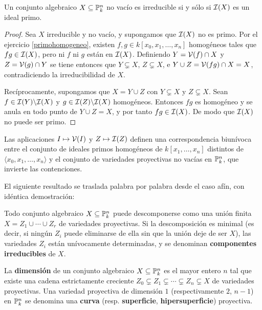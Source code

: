 \documentclass[ACGA.tex]{subfiles}
\begin{document}
 \begin{prop}
  Un conjunto algebraico $X\subseteq\mathbb{P}^n_k$ no vacío es irreducible si y sólo si $\mathcal{I}(X)$ es un ideal primo.
 \end{prop}

\begin{proof}
 Sea $X$ irreducible y no vacío, y supongamos que $\mathcal{I}(X)$ no es primo. Por el ejercicio \ref{primohomogeneo}, existen $f,g\in k[x_0,x_1,\ldots,x_n]$ homogéneos tales que $fg\in\mathcal{I}(X)$, pero ni $f$ ni $g$ están en $\mathcal{I}(X)$. Definiendo $Y=\mathcal{V}(f)\cap X$ y $Z=\mathcal{V}(g)\cap Y$ se tiene entonces que $Y\subsetneq X$, $Z\subsetneq X$, e $Y\cup Z =\mathcal{V}(fg)\cap X=X$, contradiciendo la irreducibilidad de $X$.

Recíprocamente, supongamos que $X=Y\cup Z$ con $Y\subsetneq X$ y $Z\subsetneq X$. Sean $f\in \mathcal{I}(Y)\backslash \mathcal{I}(X)$ y $g\in \mathcal{I}(Z)\backslash\mathcal{I}(X)$ homogéneos. Entonces $fg$ es homogéneo y se anula en todo punto de $Y\cup Z=X$, y por tanto $fg\in\mathcal{I}(X)$. De modo que $\mathcal{I}(X)$ no puede ser primo.
\end{proof}

\begin{coro}
 Las aplicaciones $I\mapsto\mathcal{V}(I)$ y $Z\mapsto\mathcal{I}(Z)$ definen una correspondencia biunívoca entre el conjunto de ideales primos homogéneos de $k[x_1,\ldots,x_n]$ distintos de $\langle x_0,x_1,\ldots,x_n\rangle$ y el conjunto de variedades proyectivas no vacías en $\mathbb{P}^n_k$, que invierte las contenciones.
\end{coro}

El siguiente resultado se traslada palabra por palabra desde el caso afín, con idéntica demostración:

\begin{prop}
 Todo conjunto algebraico $X\subseteq \mathbb{P}^n_k$ puede descomponerse como una unión finita $X=Z_1\cup\cdots\cup Z_r$ de variedades proyectivas. Si la descomposición es minimal (es decir, si ningún $Z_i$ puede eliminarse de ella sin que la unión deje de ser $X$), las variedades $Z_i$ están unívocamente determinadas, y se denominan {\bf componentes irreducibles} de $X$.
\end{prop}

\begin{defi} La {\bf dimensión} de un conjunto algebraico $X\subseteq\mathbb{P}^n_k$ es el mayor entero $n$ tal que existe una cadena estrictamente creciente $Z_0\subsetneq Z_1\subsetneq\cdots\subsetneq Z_n\subsetneq X$ de variedades proyectivas. Una variedad proyectiva de dimensión $1$ (respectivamente $2$, $n-1$) en $\mathbb{P}^n_k$ se denomina una {\bf curva} (resp. {\bf superficie}, {\bf hipersuperficie}) proyectiva.
\end{defi}
\end{document}
